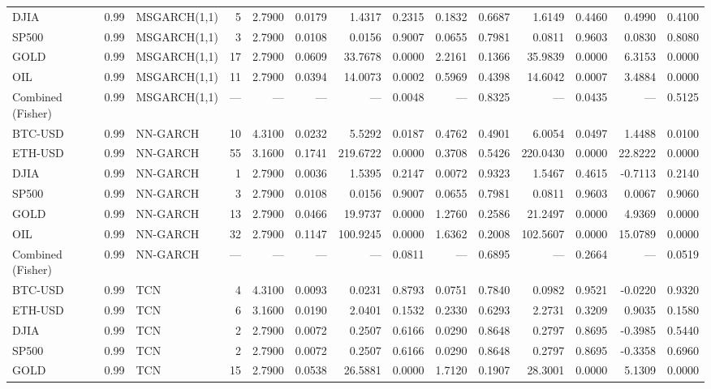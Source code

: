 \begin{table}[ht]
\begin{tabular}{lllrrrrrrrrrrr}
DJIA & 0.99 & MSGARCH(1,1) & 5 & 2.7900 & 0.0179 & 1.4317 & 0.2315 & 0.1832 & 0.6687 & 1.6149 & 0.4460 & 0.4990 & 0.4100 \\
SP500 & 0.99 & MSGARCH(1,1) & 3 & 2.7900 & 0.0108 & 0.0156 & 0.9007 & 0.0655 & 0.7981 & 0.0811 & 0.9603 & 0.0830 & 0.8080 \\
GOLD & 0.99 & MSGARCH(1,1) & 17 & 2.7900 & 0.0609 & 33.7678 & 0.0000 & 2.2161 & 0.1366 & 35.9839 & 0.0000 & 6.3153 & 0.0000 \\
OIL & 0.99 & MSGARCH(1,1) & 11 & 2.7900 & 0.0394 & 14.0073 & 0.0002 & 0.5969 & 0.4398 & 14.6042 & 0.0007 & 3.4884 & 0.0000 \\
Combined (Fisher) & 0.99 & MSGARCH(1,1) & — & — & — & — & 0.0048 & — & 0.8325 & — & 0.0435 & — & 0.5125 \\
BTC-USD & 0.99 & NN-GARCH & 10 & 4.3100 & 0.0232 & 5.5292 & 0.0187 & 0.4762 & 0.4901 & 6.0054 & 0.0497 & 1.4488 & 0.0100 \\
ETH-USD & 0.99 & NN-GARCH & 55 & 3.1600 & 0.1741 & 219.6722 & 0.0000 & 0.3708 & 0.5426 & 220.0430 & 0.0000 & 22.8222 & 0.0000 \\
DJIA & 0.99 & NN-GARCH & 1 & 2.7900 & 0.0036 & 1.5395 & 0.2147 & 0.0072 & 0.9323 & 1.5467 & 0.4615 & -0.7113 & 0.2140 \\
SP500 & 0.99 & NN-GARCH & 3 & 2.7900 & 0.0108 & 0.0156 & 0.9007 & 0.0655 & 0.7981 & 0.0811 & 0.9603 & 0.0067 & 0.9060 \\
GOLD & 0.99 & NN-GARCH & 13 & 2.7900 & 0.0466 & 19.9737 & 0.0000 & 1.2760 & 0.2586 & 21.2497 & 0.0000 & 4.9369 & 0.0000 \\
OIL & 0.99 & NN-GARCH & 32 & 2.7900 & 0.1147 & 100.9245 & 0.0000 & 1.6362 & 0.2008 & 102.5607 & 0.0000 & 15.0789 & 0.0000 \\
Combined (Fisher) & 0.99 & NN-GARCH & — & — & — & — & 0.0811 & — & 0.6895 & — & 0.2664 & — & 0.0519 \\
BTC-USD & 0.99 & TCN & 4 & 4.3100 & 0.0093 & 0.0231 & 0.8793 & 0.0751 & 0.7840 & 0.0982 & 0.9521 & -0.0220 & 0.9320 \\
ETH-USD & 0.99 & TCN & 6 & 3.1600 & 0.0190 & 2.0401 & 0.1532 & 0.2330 & 0.6293 & 2.2731 & 0.3209 & 0.9035 & 0.1580 \\
DJIA & 0.99 & TCN & 2 & 2.7900 & 0.0072 & 0.2507 & 0.6166 & 0.0290 & 0.8648 & 0.2797 & 0.8695 & -0.3985 & 0.5440 \\
SP500 & 0.99 & TCN & 2 & 2.7900 & 0.0072 & 0.2507 & 0.6166 & 0.0290 & 0.8648 & 0.2797 & 0.8695 & -0.3358 & 0.6960 \\
GOLD & 0.99 & TCN & 15 & 2.7900 & 0.0538 & 26.5881 & 0.0000 & 1.7120 & 0.1907 & 28.3001 & 0.0000 & 5.1309 & 0.0000 \\

\end{tabular}
\end{table}
